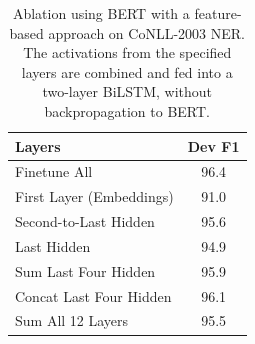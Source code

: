 \begin{table}[b]
\centering
 \begin{tabular}{@{}lc@{}}
    \toprule
 Layers & \multicolumn{1}{c}{Dev  F1} \\
    \midrule
Finetune All&	96.4 \\
    \midrule
First Layer (Embeddings)    & 91.0 \\
Second-to-Last Hidden   & 95.6 \\
Last Hidden            & 94.9 \\
Sum Last Four Hidden        & 95.9 \\
Concat Last Four Hidden        & 96.1 \\
Sum All 12 Layers        & 95.5 \\
     \bottomrule
   \end{tabular}
   \caption{Ablation using BERT with a feature-based approach on CoNLL-2003 NER. The activations from the specified layers are combined and fed into a two-layer BiLSTM, without backpropagation to BERT.}
   \label{tab:pretrained_embeddings}    
\end{table}
